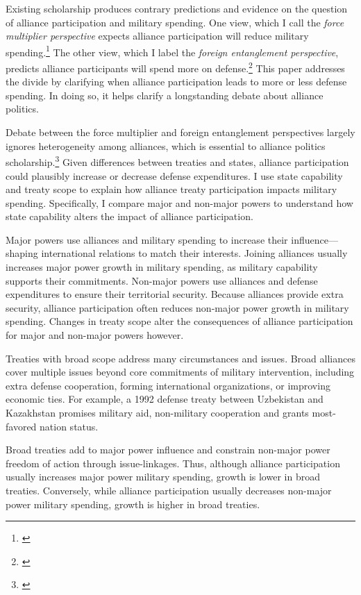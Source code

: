 \documentclass[12pt]{article}
\begin{document}
Existing scholarship produces contrary predictions and evidence on the question of alliance participation and military spending. 
One view, which I call the \textit{force multiplier perspective} expects alliance participation will reduce military spending.\footnote{\citep{Morrow1993, Conybeare1994, DigiuseppePoast2016}} 
The other view, which I label the \textit{foreign entanglement perspective}, predicts alliance participants will spend more on defense.\footnote{\citep{Diehl1994, MorganPalmer2006}}
This paper addresses the divide by clarifying when alliance participation leads to more or less defense spending. 
In doing so, it helps clarify a longstanding debate about alliance politics.


Debate between the force multiplier and foreign entanglement perspectives largely ignores heterogeneity among alliances, which is essential to alliance politics scholarship.\footnote{\citep{Morrow1991, Leeds2003, LeedsAnac2005, Fordham2010, Mattes2012, Benson2012, Poast2013, Johnsonetal2015}}  
Given differences between treaties and states, alliance participation could plausibly increase or decrease defense expenditures. 
I use state capability and treaty scope to explain how alliance treaty participation impacts military spending. 
Specifically, I compare major and non-major powers to understand how state capability alters the impact of alliance participation. 


Major powers use alliances and military spending to increase their influence--- shaping international relations to match their interests.
Joining alliances usually increases major power growth in military spending, as military capability supports their commitments. 
Non-major powers use alliances and defense expenditures to ensure their territorial security.
Because alliances provide extra security, alliance participation often reduces non-major power growth in military spending. 
Changes in treaty scope alter the consequences of alliance participation for major and non-major powers however. 


Treaties with broad scope address many circumstances and issues.
Broad alliances cover multiple issues beyond core commitments of military intervention, including extra defense cooperation, forming international organizations, or improving economic ties.  
For example, a 1992 defense treaty between Uzbekistan and Kazakhstan promises military aid, non-military cooperation and grants most-favored nation status. 


Broad treaties add to major power influence and constrain non-major power freedom of action through issue-linkages. 
Thus, although alliance participation usually increases major power military spending, growth is lower in broad treaties.  
Conversely, while alliance participation usually decreases non-major power military spending, growth is higher in broad treaties.
\end{document}
